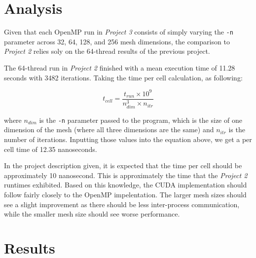 \documentclass{article}
\begin{document}
  \section{Analysis}

  Given that each OpenMP run in \textit{Project 3} consists of simply varying
  the \verb|-n| parameter across 32, 64, 128, and 256 mesh dimensions, the
  comparison to \textit{Project 2} relies soly on the 64-thread results of
  the previous project.

  The 64-thread run in \textit{Project 2} finished with a mean execution time
  of 11.28 seconds with 3482 iterations. Taking the time per cell calculation,
  as following:

  \[ t_{cell} = \frac{t_{run} \times 10^9}{n_{dim}^3 \times n_{itr}} \]

  where \(n_{dim}\) is the \verb|-n| parameter passed to the program, which
  is the size of one dimension of the mesh (where all three dimensions are the
  same) and \(n_{itr}\) is the number of iterations. Inputting those values
  into the equation above, we get a per cell time of 12.35 nanoseconds.

  In the project description given, it is expected that the time per cell
  should be approximately 10 nanosecond. This is approximately the time that
  the \textit{Project 2} runtimes exhibited. Based on this knowledge, the CUDA
  implementation should follow fairly closely to the OpenMP impelentation. The
  larger mesh sizes should see a slight improvement as there should be less
  inter-process communication, while the smaller mesh size should see worse
  performance.

  \section{Results}
\end{document}
